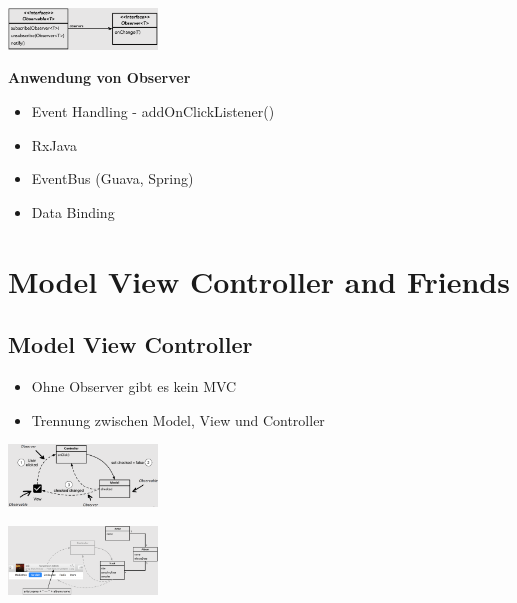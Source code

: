 \documentclass{report}
\newenvironment{Figure}
	{\par\medskip\noindent\minipage{\linewidth}}
	{\endminipage\par\medskip}
\theoremstyle{definition}
\theoremstyle{example}
\begin{document}
\begin{Figure}
   \centering
    \includegraphics[width=150px]{img/ObserverStructure.png}
        \label{fig:Observer Struktur}
\end{Figure}

\textbf{Anwendung von Observer}\\
\begin{itemize}
   \item Event Handling - addOnClickListener()
   \item RxJava
   \item EventBus (Guava, Spring)
   \item Data Binding
\end{itemize}

\section{Model View Controller and Friends}

\subsection{Model View Controller}
\begin{itemize}
   \item Ohne Observer gibt es kein MVC
   \item Trennung zwischen Model, View und Controller
\end{itemize}


\begin{Figure}
   \centering
    \includegraphics[width=150px]{img/MVC.png}
        \label{fig:MVC Abbildung}
\end{Figure}

\begin{Figure}
   \centering
    \includegraphics[width=150px]{img/MVCModel.png}
        \label{fig:MVC Model Abbildung}
\end{Figure}
\end{document}
